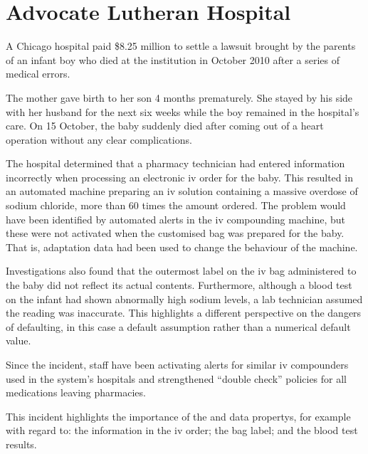 \section{Advocate Lutheran Hospital} \label{bkm:incacc:advocatelutheran}
A Chicago hospital paid \$8.25 million to settle a lawsuit brought by the parents of an infant boy who died at the institution in October 2010 after a series of medical errors.

The mother gave birth to her son 4 months prematurely. She stayed by his side with her husband for the next six weeks while the boy remained in the hospital's care. On 15 October, the baby suddenly died after coming out of a heart operation without any clear complications.

The hospital determined that a pharmacy technician had entered \gls{information} incorrectly when processing an electronic \gls{iv} order for the baby. This resulted in an automated machine preparing an \gls{iv} solution containing a massive overdose of sodium chloride, more than 60 times the amount ordered. The problem would have been identified by automated alerts in the \gls{iv} compounding machine, but these were not activated when the customised bag was prepared for the baby. That is, \gls{adaptation data} had been used to change the behaviour of the machine.

Investigations also found that the outermost label on the \gls{iv} bag administered to the baby did not reflect its actual contents. Furthermore, although a blood test on the infant had shown abnormally high sodium levels, a lab technician assumed the reading was inaccurate. This highlights a different perspective on the dangers of defaulting, in this case a default assumption rather than a numerical default value.

Since the incident, staff have been activating alerts for similar \gls{iv} compounders used in the system's hospitals and strengthened ``double check'' policies for all medications leaving pharmacies.

This incident highlights the importance of the  and  \glspl{data property}, for example with regard to: the \gls{information} in the \gls{iv} order; the bag label; and the blood test results.

